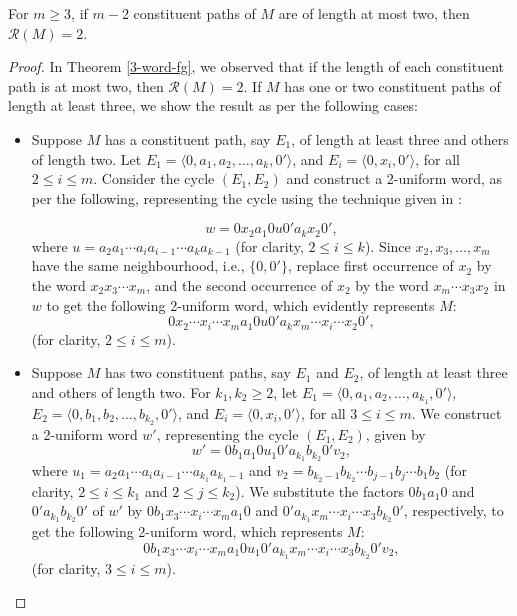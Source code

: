 \documentclass{llncs}
\begin{document}
\begin{lemma}
	For $m \ge 3$, if $m-2$ constituent paths of $M$ are of length at most two, then $\mathcal{R}(M) = 2$.   
\end{lemma}	
\begin{proof}
	In Theorem \ref{3-word-fg}, we observed that if the length of each constituent path is at most two, then $\mathcal{R}(M) = 2$. If $M$ has one or two constituent paths of length at least three, we show the result as per the following cases:   
	\begin{itemize}
		\item  Suppose $M$ has a constituent path, say $E_1$, of length at least three and others of length two. Let $E_1 = \langle 0, a_1, a_2, \ldots, a_{k}, 0' \rangle$, and $E_i = \langle 0, x_i, 0' \rangle$, for all $2 \le i \le m$. Consider the cycle $(E_1,E_2)$ and construct a 2-uniform word, as per the following, representing the cycle using the technique given in \cite[Section 3.2]{kitaev15mono}:
		
		$$w = 0 x_2 a_1 0 u 0' a_{k} x_2 0',$$ where $u = a_2 a_1 \cdots  a_{i} a_{i-1} \cdots a_{k} a_{k-1}$ (for clarity, $2 \le i \le k$).
		Since $x_2, x_3, \ldots, x_m$ have the same neighbourhood, i.e., $\{0,0'\}$, replace first occurrence of $x_2$ by the word $x_2 x_3 \cdots x_m$, and the second occurrence of $x_2$ by the word  $x_m  \cdots x_3 x_2$ in $w$ to get the following 2-uniform word, which evidently represents $M$:
		$$0 x_2  \cdots x_i \cdots x_m a_1 0 u 0' a_{k} x_m \cdots x_i \cdots x_2 0',$$ (for clarity, $2 \le i \le m$).
		
		\item Suppose $M$ has two constituent paths, say $E_1$ and $E_2$, of length at least three and others of length two. For $k_1, k_2 \ge 2$, let $E_1 = \langle 0, a_1, a_2, \ldots, a_{k_1}, 0' \rangle$,  $E_2 = \langle 0, b_1, b_2, \ldots, b_{k_2}, 0' \rangle$, and $E_i = \langle 0, x_i, 0' \rangle$, for all $3 \le i \le m$. We construct a 2-uniform word $w'$, representing the cycle $(E_1,E_2)$, given by 
		$$w' = 0 b_1 a_1 0 u_1 0' a_{k_1}  b_{k_2} 0' v_2,$$ where $u_1 = a_2 a_1 \cdots a_{i} a_{i-1} \cdots a_{k_1} a_{k_1-1}$  and $v_2 = b_{k_2 - 1} b_{k_2} \cdots b_{j-1} b_{j}\cdots b_1 b_2$ (for clarity, $2 \le i \le k_1$ and $2 \le j \le k_2$).			
		We substitute the factors $0 b_1 a_1 0$ and $0' a_{k_1} b_{k_2} 0'$ of $w'$ by $0 b_1 x_3 \cdots x_i \cdots x_m a_1 0$ and $0' a_{k_1} x_m \cdots x_i \cdots x_3 b_{k_2} 0'$, respectively, to get the following 2-uniform word, which represents $M$:
		$$0 b_1  x_3 \cdots x_i \cdots x_m  a_1 0  u_1   0' a_{k_1}  x_m \cdots x_i \cdots x_3  b_{k_2} 0' v_2,$$ (for clarity, $3 \le i \le m$).	
		

\end{itemize}
\end{proof}
\end{document}
